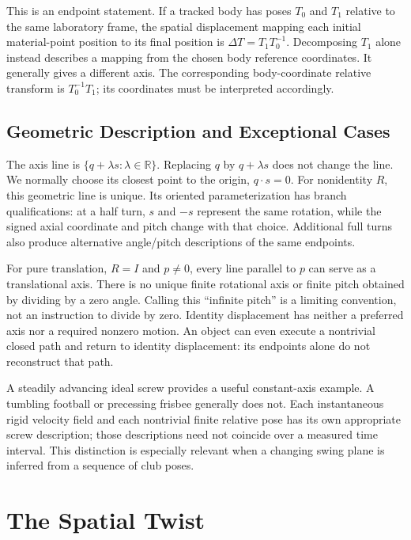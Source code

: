 This is an endpoint statement. If a tracked body has poses $T_0$ and $T_1$ relative to the same laboratory frame, the spatial displacement mapping each initial material-point position to its final position is $\Delta T=T_1T_0^{-1}$. Decomposing $T_1$ alone instead describes a mapping from the chosen body reference coordinates. It generally gives a different axis. The corresponding body-coordinate relative transform is $T_0^{-1}T_1$; its coordinates must be interpreted accordingly.

\subsection{Geometric Description and Exceptional Cases}

The axis line is $\{q+\lambda s:\lambda\in\mathbb R\}$. Replacing $q$ by $q+\lambda s$ does not change the line. We normally choose its closest point to the origin, $q\cdot s=0$. For nonidentity $R$, this geometric line is unique. Its oriented parameterization has branch qualifications: at a half turn, $s$ and $-s$ represent the same rotation, while the signed axial coordinate and pitch change with that choice. Additional full turns also produce alternative angle/pitch descriptions of the same endpoints.

For pure translation, $R=I$ and $p\ne0$, every line parallel to $p$ can serve as a translational axis. There is no unique finite rotational axis or finite pitch obtained by dividing by a zero angle. Calling this ``infinite pitch'' is a limiting convention, not an instruction to divide by zero. Identity displacement has neither a preferred axis nor a required nonzero motion. An object can even execute a nontrivial closed path and return to identity displacement: its endpoints alone do not reconstruct that path.

A steadily advancing ideal screw provides a useful constant-axis example. A tumbling football or precessing frisbee generally does not. Each instantaneous rigid velocity field and each nontrivial finite relative pose has its own appropriate screw description; those descriptions need not coincide over a measured time interval. This distinction is especially relevant when a changing swing plane is inferred from a sequence of club poses.

\section{The Spatial Twist}
\label{sec:spatial_twist}
\label{def:se3_algebra}
\label{ex:joint_twists}
\label{def:spatial_twist}

